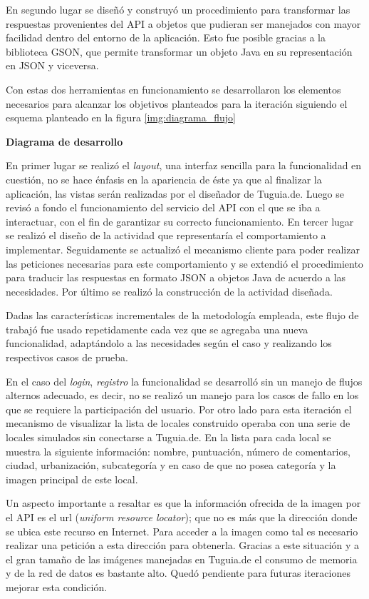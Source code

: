 En segundo lugar se diseñó y construyó un procedimiento para transformar las respuestas provenientes del API a objetos que pudieran ser manejados con mayor facilidad dentro del entorno de la aplicación. Esto fue posible gracias a la biblioteca GSON, que permite transformar un objeto Java en su representación en JSON y viceversa.

Con estas dos herramientas en funcionamiento se desarrollaron los elementos necesarios para alcanzar los objetivos planteados para la iteración siguiendo el esquema planteado en la figura \ref{img:diagrama_flujo} 


\textbf{Diagrama de desarrollo}

En primer lugar se realizó el \textit{layout}, una interfaz sencilla para la funcionalidad en cuestión, no se hace énfasis en la apariencia de éste ya que al finalizar la aplicación, las vistas serán realizadas por el diseñador de Tuguia.de. Luego se revisó a fondo el funcionamiento del servicio del API con el que se iba a interactuar, con el fin de garantizar su correcto funcionamiento. En tercer lugar se realizó el diseño de la actividad que representaría el comportamiento a implementar. Seguidamente se actualizó el mecanismo cliente para poder realizar las peticiones necesarias para este comportamiento y se extendió el procedimiento para traducir las respuestas en formato JSON a objetos Java de acuerdo a las necesidades. Por último se realizó la construcción de la actividad diseñada.

Dadas las características incrementales de la metodología empleada, este flujo de trabajó fue usado repetidamente cada vez que se agregaba una nueva funcionalidad, adaptándolo a las necesidades según el caso y realizando los respectivos casos de prueba.

En el caso del \textit{login}, \textit{registro} la funcionalidad se desarrolló sin un manejo de flujos alternos adecuado, es decir, no se realizó un manejo para los casos de fallo en los que se requiere la participación del usuario. Por otro lado para esta iteración el mecanismo de visualizar la lista de locales construido operaba con una serie de locales simulados sin conectarse a Tuguia.de. En la lista para cada local se muestra la siguiente información: nombre, puntuación, número de comentarios, ciudad, urbanización, subcategoría y en caso de que no posea categoría y la imagen principal de este local.

Un aspecto importante a resaltar es que la información ofrecida de la imagen por el API es el url (\textit{uniform resource locator}); que no es más que la dirección donde se ubica este recurso en Internet. Para acceder a la imagen como tal es necesario realizar una petición a esta dirección para obtenerla. Gracias a este situación y a el gran tamaño de las imágenes manejadas en Tuguia.de el consumo de memoria y de la red de datos es bastante alto. Quedó pendiente para futuras iteraciones mejorar esta condición.
 

